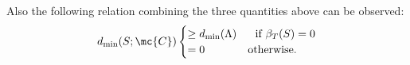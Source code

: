 \documentclass[final,onecolumn,12pt]{IEEEtran}
\def\dmin{d_{\mathrm{min}}}
\begin{document}
\vspace*{-3mm}
Also the following relation combining the three quantities above can be observed:
\begin{equation}
\dmin(S;\mc{C}) \begin{cases} \geq  \dmin(\Lambda) &~~\text{if } \beta_T(S)=0 \\
=0 & \mbox{otherwise.}  \end{cases}
\label{eqn:LatticeTsumconnection}
\end{equation}
\end{document}
